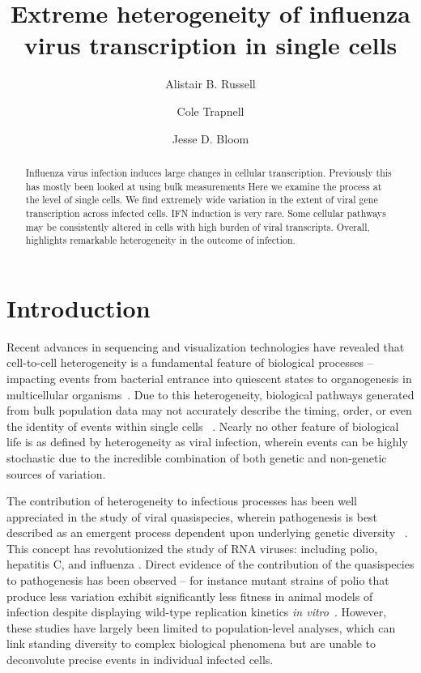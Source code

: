 \documentclass[9pt,lineno]{elife}
\title{Extreme heterogeneity of influenza virus transcription in single cells}
\author[1]{Alistair B. Russell}
\author[2]{Cole Trapnell}
\author[1,2*]{Jesse D. Bloom}
\affil[1]{Basic Sciences Division and Computational Biology Program, Fred Hutchinson Cancer Research Center, Seattle, United States}
\affil[2]{Department of Genome Sciences, University of Washington, Seattle, United States}
\begin{document}
\maketitle

\begin{abstract}
Influenza virus infection induces large changes in cellular transcription.
Previously this has mostly been looked at using bulk measurements
Here we examine the process at the level of single cells.
We find extremely wide variation in the extent of viral gene transcription across infected cells.
IFN induction is very rare.
Some cellular pathways may be consistently altered in cells with high burden of viral transcripts.
Overall, highlights remarkable heterogeneity in the outcome of infection.
\end{abstract}


\section{Introduction}
Recent advances in sequencing and visualization technologies have revealed that cell-to-cell heterogeneity is a fundamental feature of biological processes -- impacting events from bacterial entrance into quiescent states to organogenesis in multicellular organisms~\citep{JohnstonJr:2010jn}.
Due to this heterogeneity, biological pathways generated from bulk population data may not accurately describe the timing, order, or even the identity of events within single cells ~\citep{Trapnell:2014kg}.
Nearly no other feature of biological life is as defined by heterogeneity as viral infection, wherein events can be highly stochastic due to the incredible combination of both genetic and non-genetic sources of variation.

The contribution of heterogeneity to infectious processes has been well appreciated in the study of viral quasispecies, wherein pathogenesis is best described as an emergent process dependent upon underlying genetic diversity ~\citep{Lauring:2010if}.
This concept has revolutionized the study of RNA viruses: including polio, hepatitis C, and influenza \citep{Echeverria:2015ew, Kuroda:2010gt}. 
Direct evidence of the contribution of the quasispecies to pathogenesis has been observed -- for instance mutant strains of polio that produce less variation exhibit significantly less fitness in animal models of infection despite displaying wild-type replication kinetics \emph{in vitro}~\citep{Vignuzzi:2005ju}.
However, these studies have largely been limited to population-level analyses, which can link standing diversity to complex biological phenomena but are unable to deconvolute precise events in individual infected cells.
\end{document}
